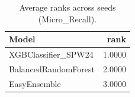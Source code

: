 \begin{table}[t]
\centering
\begin{tabular}{lr}
\toprule
Model & rank \\
\midrule
XGBClassifier_SPW24 & 1.0000 \\
BalancedRandomForest & 2.0000 \\
EasyEnsemble & 3.0000 \\
\bottomrule
\end{tabular}
\caption{Average ranks across seeds (Micro_Recall).}
\label{tab:avg_rank_Micro_Recall}
\end{table}